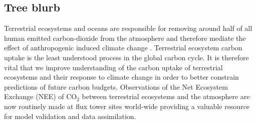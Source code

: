 \documentclass[11pt]{article}
\begin{document}
\subsection{Tree blurb}
Terrestrial ecosystems and oceans are responsible for removing around half of all human emitted carbon-dioxide from the atmosphere and therefore mediate the effect of anthropogenic induced climate change \citep{ciais2014carbon}. Terrestrial ecosystem carbon uptake is the least understood process in the global carbon cycle. It is therefore vital that we improve understanding of the carbon uptake of terrestrial ecosystems and their response to climate change in order to better constrain predictions of future carbon budgets. Observations of the Net Ecosystem Exchange (NEE) of CO$_{2}$ between terrestrial ecosystems and the atmosphere are now routinely made at flux tower sites world-wide \citep{baldocchi2008turner} providing a valuable resource for model validation and data assimilation.
\end{document}
